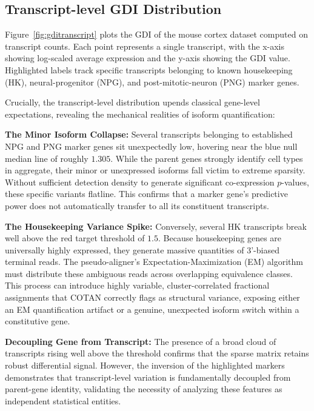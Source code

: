 \subsection*{Transcript-level GDI Distribution}\label{sec:gdi-transcript}

Figure~\ref{fig:gditranscript} plots the GDI of the mouse cortex dataset computed on transcript counts. Each point represents a single transcript, with the x-axis showing log-scaled average expression and the y-axis showing the GDI value. Highlighted labels track specific transcripts belonging to known housekeeping (HK), neural-progenitor (NPG), and post-mitotic-neuron (PNG) marker genes.

Crucially, the transcript-level distribution upends classical gene-level expectations, revealing the mechanical realities of isoform quantification:

\textbf{The Minor Isoform Collapse:} Several transcripts belonging to established NPG and PNG marker genes sit unexpectedly low, hovering near the blue null median line of roughly $1.305$. While the parent genes strongly identify cell types in aggregate, their minor or unexpressed isoforms fall victim to extreme sparsity. Without sufficient detection density to generate significant co-expression $p$-values, these specific variants flatline. This confirms that a marker gene's predictive power does not automatically transfer to all its constituent transcripts.

\textbf{The Housekeeping Variance Spike:} Conversely, several HK transcripts break well above the red target threshold of $1.5$. Because housekeeping genes are universally highly expressed, they generate massive quantities of 3'-biased terminal reads. The pseudo-aligner's Expectation-Maximization (EM) algorithm must distribute these ambiguous reads across overlapping equivalence classes. This process can introduce highly variable, cluster-correlated fractional assignments that COTAN correctly flags as structural variance, exposing either an EM quantification artifact or a genuine, unexpected isoform switch within a constitutive gene.

\textbf{Decoupling Gene from Transcript:} The presence of a broad cloud of transcripts rising well above the threshold confirms that the sparse matrix retains robust differential signal. However, the inversion of the highlighted markers demonstrates that transcript-level variation is fundamentally decoupled from parent-gene identity, validating the necessity of analyzing these features as independent statistical entities.

